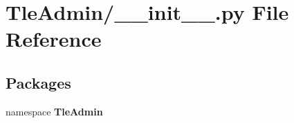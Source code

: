 \section{\-Tle\-Admin/\-\_\-\-\_\-init\-\_\-\-\_\-.py \-File \-Reference}
\label{_tle_admin_2____init_____8py}
\subsection*{\-Packages}
\begin{DoxyCompactItemize}
\item 
namespace {\bf \-Tle\-Admin}
\end{DoxyCompactItemize}

